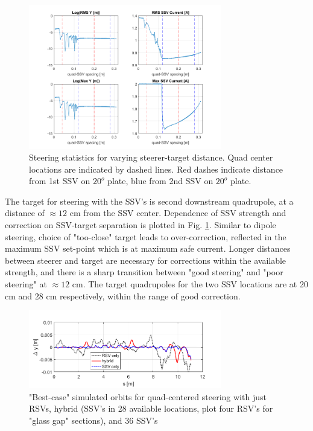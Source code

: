 \begin{figure}[htb]
\centering
\includegraphics[width=0.75\textwidth]{4.figures/SSV/steering_behaviour_vs_lever_arm_distance.png}
\caption{Steering statistics for varying steerer-target distance. Quad center locations are indicated by dashed lines. Red dashes indicate distance from 1st SSV on $20^o$ plate, blue from 2nd SSV on $20^o$ plate.}
\label{fig:lever_arm}
\end{figure}

The target for steering with the SSV's is second downstream quadrupole, at a distance of $\approx 12$ cm from the SSV center. Dependence of SSV strength and correction on SSV-target separation is plotted in Fig. \ref{fig:lever_arm}. Similar to dipole steering, choice of "too-close" target leads to over-correction, reflected in the maximum SSV set-point which is at maximum safe current. Longer distances between steerer and target are necessary for corrections within the available strength, and there is a sharp transition between "good steering" and "poor steering" at $\approx 12$ cm. The target quadrupoles for the two SSV locations are at 20 cm and 28 cm respectively, within the range of good correction.

\begin{figure}[htb]
\centering
\includegraphics[width=0.75\textwidth]{4.figures/SSV/orbit_uneven_ssvs.png}
\caption{"Best-case" simulated orbits for quad-centered steering with just RSVs, hybrid (SSV's in 28 available locations, plot four RSV's for "glass gap" sections), and 36 SSV's}
\label{fig:SSVsimorbit}
\end{figure}

